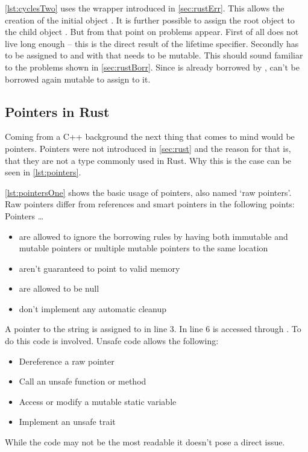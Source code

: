 \documentclass[thesis]{subfiles}
\begin{document}
    \autoref{lst:cyclesTwo} uses the  wrapper introduced in \autoref{sec:rustErr}.
    This allows the creation of the initial \Node object .
    It is further possible to assign the root object  to the child object .
    But from that point on problems appear.
    First of all does  not live long enough -- this is the direct result of the lifetime specifier.
    Secondly has  to be assigned to  and with that needs  to be mutable.
    This should sound familiar to the problems shown in \autoref{sec:rustBorr}.
    Since  is already borrowed by ,  can't be borrowed again mutable to assign  to it.

  \subsection{Pointers in Rust}
    Coming from a C++ background the next thing that comes to mind would be pointers.
    Pointers were not introduced in \autoref{sec:rust} and the reason for that is, that they are not a type commonly used in Rust.
    Why this is the case can be seen in \autoref{lst:pointers}.

    \autoref{lst:pointersOne} shows the basic usage of pointers, also named `raw pointers'.
    Raw pointers differ from references and smart pointers in the following points\autocite{rust-book}: Pointers \ldots
    \begin{itemize}
      \item are allowed to ignore the borrowing rules by having both immutable and mutable pointers or multiple mutable pointers to the same location
      \item aren't guaranteed to point to valid memory
      \item are allowed to be null
      \item don’t implement any automatic cleanup
    \end{itemize}
    A pointer to the string  is assigned to  in line 3.
    In line 6  is accessed through .
    To do this  code is involved.
    Unsafe code allows the following\autocite{rust-book}:
    \begin{itemize}
      \item Dereference a raw pointer
      \item Call an unsafe function or method
      \item Access or modify a mutable static variable
      \item Implement an unsafe trait
    \end{itemize}
    While the code may not be the most readable it doesn't pose a direct issue.
\end{document}
